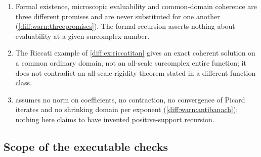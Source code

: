 \documentclass[11pt,letterpaper]{article}
\numberwithin{equation}{section}
\theoremstyle{definition}
\theoremstyle{remark}
\begin{document}
\begin{enumerate}[label=\textup{N\arabic*.},leftmargin=3.0em,itemsep=0.35em,start=39]
transported between arbitrary formal germs and fixed-domain holomorphic
families.
\item Formal existence, microscopic evaluability and common-domain coherence
are three different promises and are never substituted for one another
(\cref{diff:warn:threepromises}). The formal recursion asserts nothing about
evaluability at a given surcomplex number.
\item The Riccati example of \cref{diff:ex:riccatitan} gives an exact coherent
solution on a common ordinary domain, not an all-scale surcomplex entire
function; it does not contradict an all-scale rigidity theorem stated in a
different function class.
\item {} assumes no norm on coefficients, no
contraction, no convergence of Picard iterates and no shrinking domain per
exponent (\cref{diff:warn:antibanach}); nothing here claims to have invented
positive-support recursion.
\end{enumerate}

\subsection{Scope of the executable checks}
\label{diff:sub:nc:checks}
\end{document}
